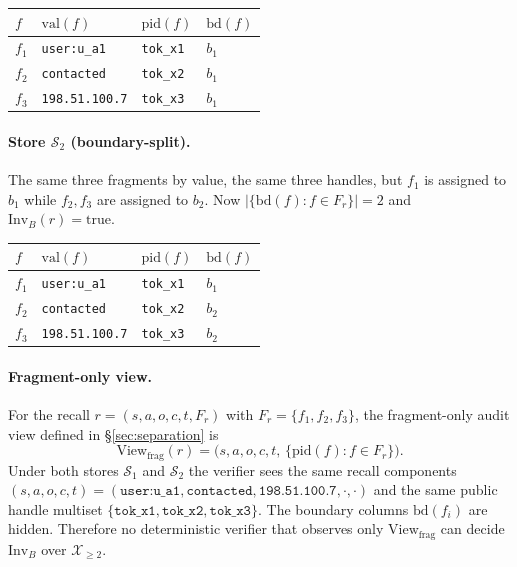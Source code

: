 \documentclass[conference,compsoc]{IEEEtran}
\begin{document}
\begin{center}
\footnotesize
\begin{tabular}{llll}
\toprule
$f$ & $\mathrm{val}(f)$ & $\mathrm{pid}(f)$ & $\mathrm{bd}(f)$ \\
\midrule
$f_1$ & \texttt{user:u\_a1} & \texttt{tok\_x1} & $b_1$ \\
$f_2$ & \texttt{contacted}   & \texttt{tok\_x2} & $b_1$ \\
$f_3$ & \texttt{198.51.100.7} & \texttt{tok\_x3} & $b_1$ \\
\bottomrule
\end{tabular}
\end{center}

\paragraph{Store $\mathcal{S}_2$ (boundary-split).} The same three fragments by value, the same three handles, but $f_1$ is assigned to $b_1$ while $f_2, f_3$ are assigned to $b_2$. Now $|\{\mathrm{bd}(f) : f \in F_r\}| = 2$ and $\mathrm{Inv}_B(r) = \mathrm{true}$.

\begin{center}
\footnotesize
\begin{tabular}{llll}
\toprule
$f$ & $\mathrm{val}(f)$ & $\mathrm{pid}(f)$ & $\mathrm{bd}(f)$ \\
\midrule
$f_1$ & \texttt{user:u\_a1}    & \texttt{tok\_x1} & $b_1$ \\
$f_2$ & \texttt{contacted}      & \texttt{tok\_x2} & $b_2$ \\
$f_3$ & \texttt{198.51.100.7}   & \texttt{tok\_x3} & $b_2$ \\
\bottomrule
\end{tabular}
\end{center}

\paragraph{Fragment-only view.} For the recall $r = (s, a, o, c, t, F_r)$ with $F_r = \{f_1, f_2, f_3\}$, the fragment-only audit view defined in \S\ref{sec:separation} is
\[
\mathrm{View}_{\mathrm{frag}}(r) = \bigl(s, a, o, c, t,\, \{\mathrm{pid}(f) : f \in F_r\}\bigr).
\]
Under both stores $\mathcal{S}_1$ and $\mathcal{S}_2$ the verifier sees the same recall components $(s, a, o, c, t) = (\texttt{user:u\_a1}, \texttt{contacted}, \texttt{198.51.100.7}, \cdot, \cdot)$ and the same public handle multiset $\{\texttt{tok\_x1}, \texttt{tok\_x2}, \texttt{tok\_x3}\}$. The boundary columns $\mathrm{bd}(f_i)$ are hidden. Therefore no deterministic verifier that observes only $\mathrm{View}_{\mathrm{frag}}$ can decide $\mathrm{Inv}_B$ over $\mathcal{X}_{\geq 2}$.
\end{document}
